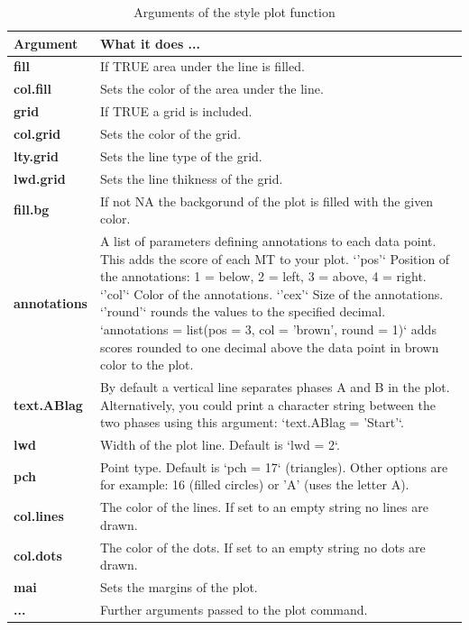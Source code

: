 \documentclass[
]{book}
\begin{document}
\begin{table}

\caption{\label{tab:table-style}Arguments of the style plot function}
\centering
\begin{tabular}[t]{>{\raggedright\arraybackslash}p{15em}>{\raggedright\arraybackslash}p{30em}}
\toprule
Argument & What it does ...\\
\midrule
\textbf{fill} & If TRUE area under the line is filled.\\
\textbf{col.fill} & Sets the color of the area under the line.\\
\textbf{grid} & If TRUE a grid is included.\\
\textbf{col.grid} & Sets the color of the grid.\\
\textbf{lty.grid} & Sets the line type of the grid.\\
\addlinespace
\textbf{lwd.grid} & Sets the line thikness of the grid.\\
\textbf{fill.bg} & If not NA the backgorund of the plot is filled with the given color.\\
\textbf{annotations} & A list of parameters defining annotations to each data point. This adds the score of each MT to your plot. `'pos'` Position of the annotations: 1 = below, 2 = left, 3 = above, 4 = right. `'col'` Color of the annotations. `'cex'` Size of the annotations. `'round'` rounds the values to the specified decimal. `annotations = list(pos = 3, col = 'brown', round = 1)` adds scores rounded to one decimal above the data point in brown color to the plot.\\
\textbf{text.ABlag} & By default a vertical line separates phases A and B in the plot. Alternatively, you could print a character string between the two phases using this argument: `text.ABlag = 'Start'`.\\
\textbf{lwd} & Width of the plot line. Default is `lwd = 2`.\\
\addlinespace
\textbf{pch} & Point type. Default is `pch = 17` (triangles). Other options are for example: 16 (filled circles) or 'A' (uses the letter A).\\
\textbf{col.lines} & The color of the lines. If set to an empty string no lines are drawn.\\
\textbf{col.dots} & The color of the dots. If set to an empty string no dots are drawn.\\
\textbf{mai} & Sets the margins of the plot.\\
\textbf{...} & Further arguments passed to the plot command.\\
\bottomrule
\end{tabular}
\end{table}
\end{document}
